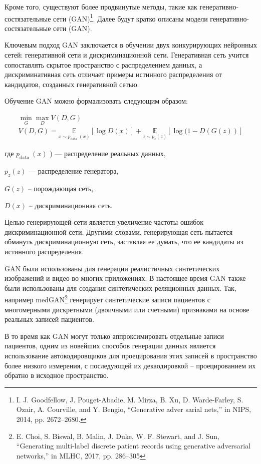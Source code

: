 \documentclass[12pt,a4paper, oneside]{extreport}
\begin{document}
Кроме того, существуют более продвинутые методы, такие как генеративно-состязательные сети (GAN)\footnote{I. J. Goodfellow, J. Pouget-Abadie, M. Mirza, B. Xu, D. Warde-Farley, S. Ozair, A. Courville, and Y. Bengio, “Generative adver	sarial nets,” in NIPS, 2014, pp. 2672–2680.}. Далее будут кратко описаны модели генеративно-состязательные сети (GAN). 

Ключевым  подход GAN заключается в обучении двух конкурирующих нейронных сетей: генеративной сети и дискриминационной сети. Генеративная сеть учится сопоставлять скрытое пространство с распределением данных, а дискриминативная сеть отличает примеры истинного распределения от кандидатов, созданных генеративной сетью.

Обучение GAN можно формализовать следующим образом:

$$
\begin{array}{c}
	\min _{G} \max _{D} V(D, G) \\
	V(D, G)=\underset{x \sim p_{\text {data }}(x)}{\mathbb{E}}[\log D(x)]+\underset{z \sim p_{z}(z)}{\mathbb{E}}[\log (1-D(G(z))]
\end{array}
$$


где  $p_{\text {data }}(x)$ ) — распределение реальных данных,

$p_{z}(z)$  — распределение генератора, 

$G(z)$ --  порождающая сеть, 

$D(x)$  --  дискриминационная сеть. 


Целью генерирующей сети является увеличение частоты ошибок дискриминационной сети. Другими словами, генерирующая сеть пытается обмануть дискриминационную сеть, заставляя ее думать, что ее кандидаты из истинного распределения. 

GAN были использованы для генерации реалистичных синтетических изображений и видео во многих приложениях. В настоящее время GAN также были использованы  для создания синтетических реляционных данных. Так, например  medGAN\footnote{E. Choi, S. Biswal, B. Malin, J. Duke, W. F. Stewart, and J. Sun, 	“Generating multi-label discrete patient records using generative 	adversarial networks,” in MLHC, 2017, pp. 286–305} генерирует синтетические записи пациентов с многомерными дискретными  (двоичными или счетными) признаками  на основе реальных записей пациентов. 

В то время как GAN могут только аппроксимировать отдельные записи пациентов, одним из новейших способов генерации данных является  использование  автокодировщиков для проецирования этих записей в пространство более низкого измерения, с последующей их декаодировкой -- проецированием  их обратно в исходное пространство.
\end{document}
